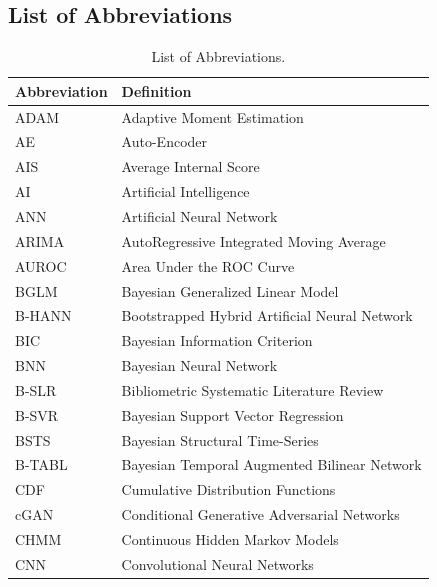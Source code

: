 \subsection{List of Abbreviations}
\label{appendix:list_of_abbrevations}

\renewcommand{\thetable}{A\arabic{table}} %
\setcounter{table}{0} %

\begin{table}[H]
    \centering
    \caption[List of Abbreviations]{List of Abbreviations.}
    \label{table:abbreviations}
    \fontsize{8.5}{10.8}\selectfont
    \begin{subtable}[t]{0.49\textwidth}
        \centering
        \begin{tabular}{lp{}}
        \toprule
        \textbf{Abbreviation} & \textbf{Definition} \\
        \midrule
        ADAM & Adaptive Moment Estimation \\
        AE & Auto-Encoder \\
        AIS & Average Internal Score \\
        AI & Artificial Intelligence \\
        ANN & Artificial Neural Network \\
        ARIMA & AutoRegressive Integrated Moving Average \\
        AUROC & Area Under the ROC Curve \\
        BGLM & Bayesian Generalized Linear Model \\
        B-HANN & Bootstrapped Hybrid Artificial Neural Network \\
        BIC & Bayesian Information Criterion \\
        BNN & Bayesian Neural Network \\
        B-SLR & Bibliometric Systematic Literature Review \\
        B-SVR & Bayesian Support Vector Regression \\
        BSTS & Bayesian Structural Time-Series \\
        B-TABL & Bayesian Temporal Augmented Bilinear Network \\
        CDF & Cumulative Distribution Functions \\
        cGAN & Conditional Generative Adversarial Networks \\
        CHMM & Continuous Hidden Markov Models \\
        CNN & Convolutional Neural Networks \\

\end{tabular}
\end{subtable}
\end{table}
